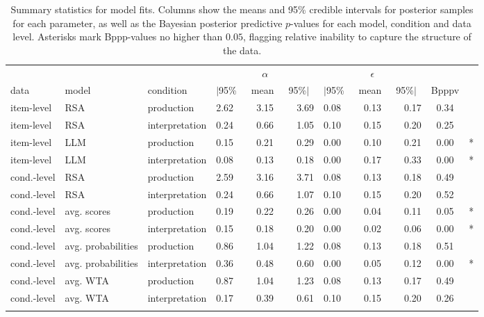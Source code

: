 \documentclass[fleqn]{article}
\begin{document}
\begin{table}[t]
\centering
\begin{tabular}{llllcrlcrcl}
  \toprule
  &&&& $\alpha$ &&& $\epsilon$ & \\ \cmidrule(r){4-6} \cmidrule(l){7-9}
  data & model & condition & $|$95\%\ & mean\ & 95\%$|$\ & $|$95\%\ & mean\ & 95\%$|$\ & Bpppv & \\
  \midrule

  item-level  & RSA                & production     & 2.62 & 3.15 & 3.69 & 0.08 & 0.13 & 0.17 & 0.34 &  \\
  item-level  & RSA                & interpretation & 0.24 & 0.66 & 1.05 & 0.10 & 0.15 & 0.20 & 0.25 &  \\
  item-level  & LLM                & production     & 0.15 & 0.21 & 0.29 & 0.00 & 0.10 & 0.21 & 0.00 & * \\
  item-level  & LLM                & interpretation & 0.08 & 0.13 & 0.18 & 0.00 & 0.17 & 0.33 & 0.00 & * \\
  cond.-level & RSA                & production     & 2.59 & 3.16 & 3.71 & 0.08 & 0.13 & 0.18 & 0.49 &  \\
  cond.-level & RSA                & interpretation & 0.24 & 0.66 & 1.07 & 0.10 & 0.15 & 0.20 & 0.52 &  \\
  cond.-level & avg. scores        & production     & 0.19 & 0.22 & 0.26 & 0.00 & 0.04 & 0.11 & 0.05 & * \\
  cond.-level & avg. scores        & interpretation & 0.15 & 0.18 & 0.20 & 0.00 & 0.02 & 0.06 & 0.00 & * \\
  cond.-level & avg. probabilities & production     & 0.86 & 1.04 & 1.22 & 0.08 & 0.13 & 0.18 & 0.51 &  \\
  cond.-level & avg. probabilities & interpretation & 0.36 & 0.48 & 0.60 & 0.00 & 0.05 & 0.12 & 0.00 & * \\
  cond.-level & avg. WTA           & production     & 0.87 & 1.04 & 1.23 & 0.08 & 0.13 & 0.17 & 0.49 &  \\
  cond.-level & avg. WTA           & interpretation & 0.17 & 0.39 & 0.61 & 0.10 & 0.15 & 0.20 & 0.26 &  \\

   \bottomrule \\
\end{tabular}
\caption{
  Summary statistics for model fits.
  Columns show the means and 95\% credible intervals for posterior samples for each parameter, as well as the Bayesian posterior predictive $p$-values for each model, condition and data level.
  Asterisks mark Bppp-values no higher than $0.05$, flagging relative inability to capture the structure of the data.
}
\label{tab:sumStats}
\end{table}
\end{document}
